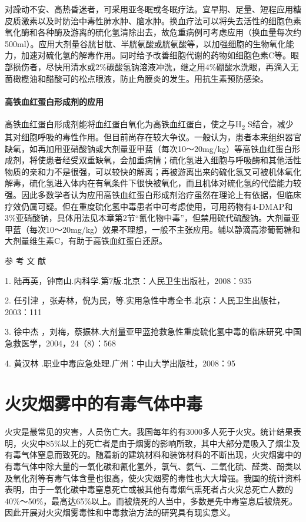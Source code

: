 对躁动不安、高热昏迷者，可采用亚冬眠或冬眠疗法。宜早期、足量、短程应用糖皮质激素以及时防治中毒性肺水肿、脑水肿。换血疗法可以将失去活性的细胞色素氧化酶和各种酶及游离的硫化氢清除出去，故危重病例可考虑应用（换血量每次约500ml）。应用大剂量谷胱甘肽、半胱氨酸或胱氨酸等，以加强细胞的生物氧化能力，加速对硫化氢的解毒作用。同时给予改善细胞代谢的药物如细胞色素C等。眼部损伤者，尽快用清水或2\%碳酸氢钠溶液冲洗，继之用4\%硼酸水洗眼，再滴入无菌橄榄油和醋酸可的松点眼液，防止角膜炎的发生。用抗生素预防感染。

\paragraph{高铁血红蛋白形成剂的应用}

高铁血红蛋白形成剂能将血红蛋白氧化为高铁血红蛋白，使之与H\textsubscript{2}
S结合，减少其对细胞呼吸的毒性作用。但目前尚存在较大争议。一般认为，患者本来组织器官缺氧，如再加用亚硝酸钠或大剂量亚甲蓝（每次10～20mg/kg）等高铁血红蛋白形成剂，将使患者经受双重缺氧，会加重病情；硫化氢进入细胞与呼吸酶和其他活性物质的亲和力不是很强，可以较快的解离；再被游离出来的硫化氢又可被机体氧化解毒，硫化氢进入体内在有氧条件下很快被氧化，而且机体对硫化氢的代偿能力较强。因此多数学者认为应用高铁血红蛋白形成剂治疗虽然在理论上有依据，但临床疗效仍属可疑。但在重度硫化氢中毒患者中可考虑使用，可用药物有4-DMAP和3\%亚硝酸钠，具体用法见本章第2节“氰化物中毒”，但禁用硫代硫酸钠。大剂量亚甲蓝（每次10～20mg/kg）效果不理想，一般不主张应用。辅以静滴高渗葡萄糖和大剂量维生素C，有助于高铁血红蛋白还原。

\hypertarget{text00149.htmlux5cux23CHP5-4-3-4}{}
参 考 文 献

1. 陆再英，钟南山.内科学.第7版.北京：人民卫生出版社，2008：935

2. 任引津
，张寿林，倪为民，等.实用急性中毒全书.北京：人民卫生出版社，2003：111

3. 徐中杰
，刘梅，蔡振林.大剂量亚甲蓝抢救急性重度硫化氢中毒的临床研究.中国急救医学，2004，24（8）：568

4. 黄汉林 .职业中毒应急处理.广州：中山大学出版社，2008：95

\protect\hypertarget{text00150.html}{}{}

\section{火灾烟雾中的有毒气体中毒}

火灾是最常见的灾害，人员伤亡大。我国每年约有3000多人死于火灾。统计结果表明，火灾中85\%以上的死亡者是由于烟雾的影响所致，其中大部分是吸入了烟尘及有毒气体窒息而致死的。随着新的建筑材料和装饰材料的不断出现，火灾烟雾中的有毒气体中除大量的一氧化碳和氰化氢外，氯气、氨气、二氧化硫、醛类、酚类以及氧化剂等有毒气体含量也很高，使火灾烟雾的毒性也大大增强。我国的统计资料表明，由于一氧化碳中毒窒息死亡或被其他有毒烟气熏死者占火灾总死亡人数的40\%～50\%，最高达65\%以上。而被烧死的人当中，多数是先中毒窒息后被烧死。因此开展对火灾烟雾毒性和中毒救治方法的研究具有现实意义。

